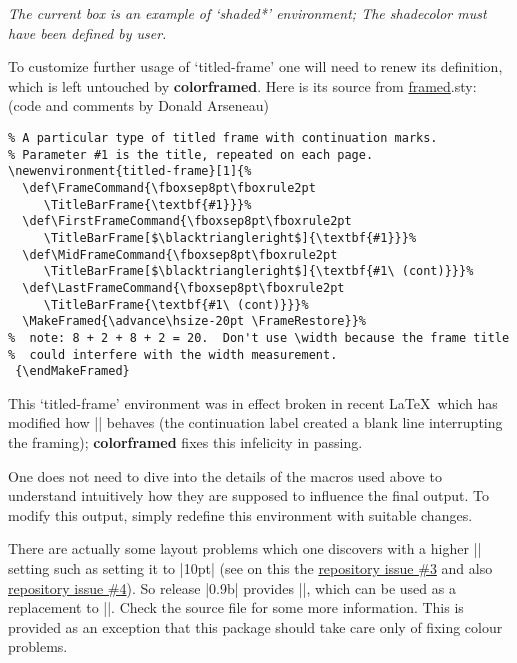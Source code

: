 \documentclass[a4paper,dvipdfmx,10pt,english]{article}
\def\ctanpackage#1{\href{https://ctan.org/pkg/#1}{#1}}
\newcommand\colorframed{%
        \texorpdfstring{{\color{joli}\bfseries colorframed}}{colorframed}\xspace}
\newcommand\ghissue[2][]{\href{https://github.com/jfbu/colorframed/issues/#2}{#1\##2}}
\begin{document}
\begin{shaded*}
\begin{footnotesize}
\emph{The current box is an example of \emph{`shaded*'}
    environment; The
    \emph{shadecolor} must have been defined by user.}
\par  To customize
  further usage of `titled-frame' one will need to renew its definition,
  which is left untouched by \colorframed.
  Here is its source from \ctanpackage{framed}.sty: (code and
  comments by Donald Arseneau)%
\begin{verbatim}
% A particular type of titled frame with continuation marks.  
% Parameter #1 is the title, repeated on each page.
\newenvironment{titled-frame}[1]{%
  \def\FrameCommand{\fboxsep8pt\fboxrule2pt
     \TitleBarFrame{\textbf{#1}}}%
  \def\FirstFrameCommand{\fboxsep8pt\fboxrule2pt
     \TitleBarFrame[$\blacktriangleright$]{\textbf{#1}}}%
  \def\MidFrameCommand{\fboxsep8pt\fboxrule2pt
     \TitleBarFrame[$\blacktriangleright$]{\textbf{#1\ (cont)}}}%
  \def\LastFrameCommand{\fboxsep8pt\fboxrule2pt
     \TitleBarFrame{\textbf{#1\ (cont)}}}%
  \MakeFramed{\advance\hsize-20pt \FrameRestore}}%
%  note: 8 + 2 + 8 + 2 = 20.  Don't use \width because the frame title
%  could interfere with the width measurement.
 {\endMakeFramed}
\end{verbatim}
  This `titled-frame' environment was in effect broken in recent \LaTeX\ which
  has modified how |\smash| behaves (the continuation label created a blank
  line interrupting the framing); \colorframed fixes this infelicity in
  passing.

  One does not need to dive into the details of the macros
  used above to understand intuitively how they are supposed
  to influence the final output.  To modify this output,
  simply redefine this environment with suitable changes.

  There are actually some layout problems which one discovers with a higher
  |\fboxrule| setting such as setting it to |10pt| (see on this the
  \ghissue[repository issue ]{3} and also \ghissue[repository issue ]{4}).  So
  release |0.9b| provides ||, which can be used as a
  replacement to |\TitleBarFrame|.  Check the source file for some more
  information.  This is provided as an exception that this package should take
  care only of fixing colour problems.

\end{footnotesize}
\end{shaded*}
\end{document}
